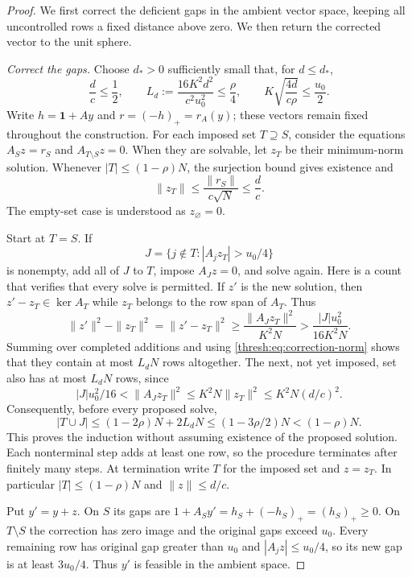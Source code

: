 \documentclass[11pt,a4paper]{article}
\numberwithin{equation}{section}
\theoremstyle{definition}
\theoremstyle{remark}
\begin{document}
\begin{proof}
We first correct the deficient gaps in the ambient vector space, keeping
all uncontrolled rows a fixed distance above zero.  We then return the
corrected vector to the unit sphere.

\emph{Correct the gaps.}
Choose $d_*>0$ sufficiently small that, for $d\leq d_*$,
\begin{equation}
 \frac dc\leq\frac12,\qquad
 L_d:=\frac{16K^2d^2}{c^2u_0^2}\leq\frac\rho4,\qquad
 K\sqrt{\frac{4d}{c\rho}}\leq\frac{u_0}{2}.
 \label{thresh:eq:repair-smallness}
\end{equation}
Write $h=\mathbf 1+Ay$ and $r=(-h)_+=r_A(y)$; these vectors
remain fixed throughout the construction.  For each imposed set
$T\supseteq S$, consider the equations $A_Sz=r_S$ and
$A_{T\setminus S}z=0$.  When they are solvable, let $z_T$ be their
minimum-norm solution.  Whenever $|T|\leq(1-\rho)N$, the
surjection bound gives existence and
\begin{equation}
 \|z_T\|\leq\frac{\|r_S\|}{c\sqrt N}\leq\frac dc.
 \label{thresh:eq:correction-norm}
\end{equation}
The empty-set case is understood as $z_\varnothing=0$.

Start at $T=S$.  If
\[
 J=\{j\notin T:|A_jz_T|>u_0/4\}
\]
is nonempty, add all of $J$ to $T$, impose $A_Jz=0$, and solve again.
Here is a count that verifies that every solve is permitted.
If $z'$ is the new solution, then $z'-z_T\in\ker A_T$ while
$z_T$ belongs to the row span of $A_T$.  Thus
\[
 \|z'\|^2-\|z_T\|^2=\|z'-z_T\|^2
 \geq\frac{\|A_Jz_T\|^2}{K^2N}
 >\frac{|J|u_0^2}{16K^2N}.
\]
Summing over completed additions and using
\eqref{thresh:eq:correction-norm} shows that they contain at most
$L_dN$ rows altogether.  The next, not yet imposed, set also has at
most $L_dN$ rows, since
\[
 |J|u_0^2/16<\|A_Jz_T\|^2
 \leq K^2N\|z_T\|^2\leq K^2N(d/c)^2.
\]
Consequently, before every proposed solve,
\[
 |T\cup J|\leq(1-2\rho)N+2L_dN
             \leq(1-3\rho/2)N<(1-\rho)N.
\]
This proves the induction without assuming existence of the proposed
solution.  Each nonterminal step adds at least one row, so the
procedure terminates after finitely many steps.  At termination write
$T$ for the imposed set and $z=z_T$.  In particular
$|T|\leq(1-\rho)N$ and $\|z\|\leq d/c$.

Put $y'=y+z$.  On $S$ its gaps are
$1+A_Sy'=h_S+(-h_S)_+=(h_S)_+\geq0$.
On $T\setminus S$ the correction has zero image and the original gaps
exceed $u_0$.  Every remaining row has original gap greater than $u_0$
and $|A_jz|\leq u_0/4$, so its new gap is at least $3u_0/4$.
Thus $y'$ is feasible in the ambient space.


\end{proof}
\end{document}
